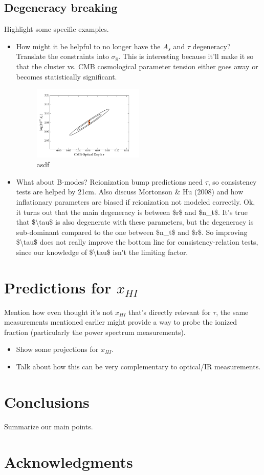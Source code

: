 \documentclass[twocolumn,aps,prd,nofootinbib,showpacs]{revtex4-1}
\begin{document}
\subsection{Degeneracy breaking}
Highlight some specific examples.
\begin{itemize}
\item How might it be helpful to no longer have the $A_s$ and $\tau$ degeneracy? Translate the constraints into $\sigma_8$. This is interesting because it'll make it so that the cluster vs. CMB cosmological parameter tension either goes away or becomes statistically significant.

\begin{figure}[!]
	\centering
	\includegraphics[width=0.5\textwidth]{figures/AsTau_w21cm.png}
	\caption{asdf}
	\label{fig:AsTau_w21cm}
\end{figure}

\item What about B-modes? Reionization bump predictions need $\tau$, so consistency tests are helped by 21cm. Also discuss Mortonson \& Hu (2008) and how inflationary parameters are biased if reionization not modeled correctly.
\acl{Ok, it turns out that the main degeneracy is between $r$ and $n_t$. It's true that $\tau$ is also degenerate with these parameters, but the degeneracy is sub-dominant compared to the one between $n_t$ and $r$. So improving $\tau$ does not really improve the bottom line for consistency-relation tests, since our knowledge of $\tau$ isn't the limiting factor.}
\end{itemize}

\section{Predictions for $x_{HI}$}
Mention how even thought it's not $x_{HI}$ that's directly relevant for $\tau$, the same measurements mentioned earlier might provide a way to probe the ionized fraction (particularly the power spectrum measurements).
\begin{itemize}
\item Show some projections for $x_{HI}$.
\item Talk about how this can be very complementary to optical/IR measurements.
\end{itemize}

\section{Conclusions}
Summarize our main points.

\section*{Acknowledgments}



\end{document}
